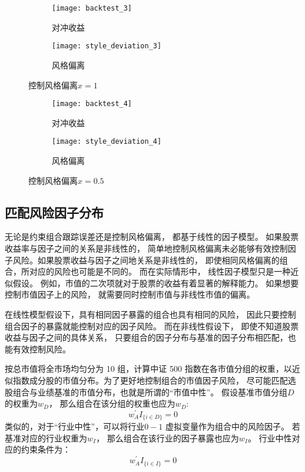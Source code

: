 \documentclass[UTF8,11pt]{ctexart}
\begin{document}
\begin{figure}
	\centering
	\begin{subfigure}[b]{0.45\textwidth}
		\centering
		\texttt{[image: backtest\_3]}
		\caption{对冲收益}
	\end{subfigure}
	\hfill
	\begin{subfigure}[b]{0.45\textwidth}
		\centering
		\texttt{[image: style\_deviation\_3]}
		\caption{风格偏离}
	\end{subfigure}
	\caption{控制风格偏离$x=1$}
	\label{fig:figs3}
\end{figure}

\begin{figure}
	\centering
	\begin{subfigure}[b]{0.45\textwidth}
		\centering
		\texttt{[image: backtest\_4]}
		\caption{对冲收益}
	\end{subfigure}
	\hfill
	\begin{subfigure}[b]{0.45\textwidth}
		\centering
		\texttt{[image: style\_deviation\_4]}
		\caption{风格偏离}
	\end{subfigure}
	\caption{控制风格偏离$x=0.5$}
	\label{fig:figs4}
\end{figure}

\subsection{匹配风险因子分布}
无论是约束组合跟踪误差还是控制风格偏离， 都基于线性的因子模型。 如果股票收益率与因子之间的关系是非线性的， 简单地控制风格偏离未必能够有效控制因子风险。如果股票收益与因子之间地关系是非线性的， 即使相同风格偏离的组合，所对应的风险也可能是不同的。 而在实际情形中， 线性因子模型只是一种近似假设。 例如，市值的二次项就对于股票的收益有着显著的解释能力。 如果想要控制市值因子上的风险， 就需要同时控制市值与非线性市值的偏离。

在线性模型假设下，具有相同因子暴露的组合也具有相同的风险， 因此只要控制组合因子的暴露就能控制对应的因子风险。 而在非线性假设下， 即使不知道股票收益与因子之间的具体关系， 只要组合的因子分布与基准的因子分布相匹配，也能有效控制风险。

按总市值将全市场均匀分为 10 组，计算中证 500 指数在各市值分组的权重，以近似指数成分股的市值分布。为了更好地控制组合的市值因子风险， 尽可能匹配选股组合与业绩基准的市值分布，也就是所谓的“市值中性”。 假设基准市值分组$D$的权重为$w_D$， 那么组合在该分组的权重也应为$w_D$:
\begin{equation}
w_A^\prime I_{\{i\in D\}}=0
\end{equation}
类似的，对于“行业中性”，可以将行业$0-1$ 虚拟变量作为组合中的风险因子。 若基准对应的行业权重为$w_I$， 那么组合在该行业的因子暴露也应为$w_I$。 行业中性对应的约束条件为：
\begin{equation}
w_A^\prime I_{\{i\in I\}}=0
\end{equation}
\end{document}
